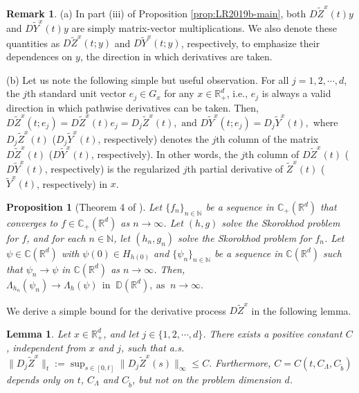 \documentclass[11pt]{article}
\theoremstyle{definition}
\newtheorem{remark}[assumption]{Remark}
\theoremstyle{plain}
\newtheorem{proposition}[assumption]{Proposition}
\newtheorem{lemma}[assumption]{Lemma}
\newcommand{\R}{\mathbb{R}}
\newcommand{\C}{\mathbb{C}}
\newcommand{\D}{\mathbb{D}}
\newcommand{\tb}{\tilde{b}}
\begin{document}
\begin{remark}
(a) In part (iii) of Proposition \ref{prop:LR2019b-main}, both $D\tilde Z^x(t) y$ and $D\tilde Y^x(t) y$ are simply matrix-vector multiplications. 
We also denote these quantities as $D\tilde Z^x(t; y)$ and $D\tilde Y^x(t; y)$, respectively, to emphasize their dependences on $y$, 
the direction in which derivatives are taken. 

(b) Let us note the following simple but useful observation. For all $j = 1, 2, \cdots, d$, the $j$th standard unit vector $e_j \in G_x$ 
for any $x\in \R_+^d$, i.e., $e_j$ is always a valid direction in which pathwise derivatives can be taken. 
Then, 
\(
D\tilde Z^x(t; e_j) = D\tilde Z^x(t)e_j = D_j\tilde Z^x(t), \text{ and } D\tilde Y^x(t; e_j) = D_j \tilde Y^x(t),
\)
where $D_j\tilde Z^x(t)$ ($D_j \tilde Y^x(t)$, respectively) denotes the $j$th column of the matrix $D\tilde Z^x(t)$ ($D\tilde Y^x(t)$, respectively). 
In other words, the $j$th column of $D\tilde Z^x(t)$ ($D\tilde Y^x(t)$, respectively) is the regularized $j$th partial derivative of $\tilde Z^x(t)$ ($\tilde Y^x(t)$, respectively) in $x$.

\end{remark}

\begin{proposition}[Theorem 4 of \cite{LipshutzRamanan2019a}]\label{prop:Lambda-Dconv}
Let $\{f_n\}_{n \in \mathbb{N}}$ be a sequence in $\C_+(\mathbb{R}^d)$ that converges to $f \in \C_+(\mathbb{R}^d)$ as $n \to \infty$.
Let $(h,g)$ solve the Skorokhod problem for $f$, and for each $n \in \mathbb{N}$, let $(h_n,g_n)$ solve the Skorokhod problem for $f_n$.
Let $\psi \in \C(\mathbb{R}^d)$ with $\psi(0) \in H_{h(0)}$ and $\{\psi_n\}_{n \in \mathbb{N}}$ be a sequence in $\C(\mathbb{R}^d)$ such that
$\psi_n \to \psi$ in $\C(\mathbb{R}^d)$ as $n \to \infty$. Then,
\(
\Lambda_{h_n}(\psi_n) \to \Lambda_h(\psi) \ \ \text{in } \ \D(\mathbb{R}^d), \ \text{as } \ n \to \infty.
\)
\end{proposition}
We derive a simple bound for the derivative process $D \tilde{Z}^x$ in the following lemma. 
\begin{lemma}\label{lem:bound-DZ}
Let $x \in \mathbb{R}^d_+$, and let $j \in \{1, 2, \cdots, d\}$. There exists a positive constant $C$, independent from $x$ and $j$, such that a.s.
\(
\| D_j \tilde{Z}^x \|_t := \sup_{s \in [0,t]} \|D_j \tilde{Z}^x(s)\|_\infty \leq C.
\)
Furthermore, $C = C(t, C_{\Lambda}, C_{\tb})$ depends only on $t$, $C_{\Lambda}$ and $C_{\tb}$, but not on the problem dimension $d$. 
\end{lemma}
\end{document}

